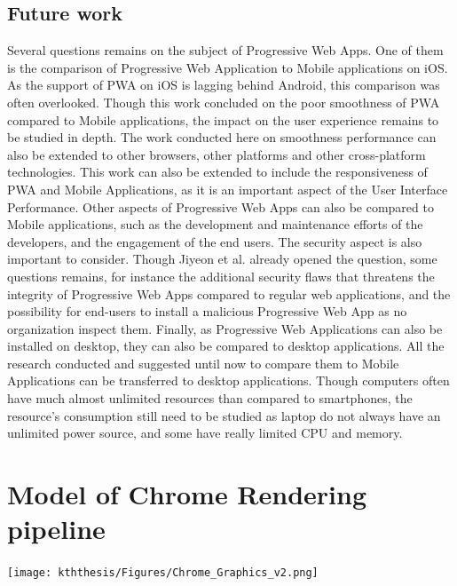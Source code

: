 \documentclass{kththesis}
\begin{document}
\section{Future work}
Several questions remains on the subject of Progressive Web Apps. One of them is the comparison of Progressive Web Application to Mobile applications on iOS. As the support of PWA on iOS is lagging behind Android, this comparison was often overlooked. \newline
Though this work concluded on the poor smoothness of PWA compared to Mobile applications, the impact  on the user experience remains to be studied in depth. 
The work conducted here on smoothness performance can also be extended to other browsers, other platforms and other cross-platform technologies. This work can also be extended to include the responsiveness of PWA and Mobile Applications, as it is an important aspect of the User Interface Performance. \newline
Other aspects of Progressive Web Apps can also be compared to Mobile applications, such as the development and maintenance efforts of the developers, and the engagement of the end users. \newline
The security aspect is also important to consider. Though Jiyeon et al. \cite{Pride_Prejudice} already opened the question, some questions remains, for instance the additional security flaws that threatens the integrity of Progressive Web Apps compared to regular web applications, and the possibility for end-users to install a malicious Progressive Web App as no organization inspect them.
Finally, as Progressive Web Applications can also be installed on desktop, they can also be compared to desktop applications. All the research conducted and suggested until now to compare them to Mobile Applications can be transferred to desktop applications. Though computers often have much almost unlimited resources than compared to smartphones, the resource's consumption still need to be studied as laptop do not always have an unlimited power source, and some have really limited CPU and memory. 



\listoffigures
\printbibliography[heading=bibintoc]

\appendix
    \chapter{Model of Chrome Rendering pipeline}
    \label{annex:chrome_model}
    
    \begin{center}
        \texttt{[image: kththesis/Figures/Chrome\_Graphics\_v2.png]}
    \end{center}


\tailmatter
\end{document}
